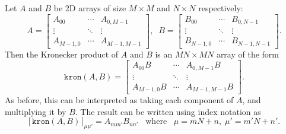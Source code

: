 \documentclass[prx,12pt]{revtex4-2}
\begin{document}
Let $A$ and $B$ be 2D arrays of size $M\times M$ and $N\times N$
respectively:
\begin{equation}
  A = \begin{bmatrix}A_{00} & \cdots & A_{0,M-1} \\ \vdots & \ddots & \vdots \\ A_{M-1,0} & \cdots & A_{M-1,M-1} \end{bmatrix}, \;\;
  B = \begin{bmatrix}B_{00} & \cdots & B_{0,N-1} \\ \vdots & \ddots & \vdots \\  B_{N-1,0} & \cdots & B_{N-1,N-1} \end{bmatrix}.
\end{equation}
Then the Kronecker product of $A$ and $B$ is an $MN\times MN$ array of
the form
\begin{equation}
  \texttt{kron}(A,B) = \begin{bmatrix} A_{00}B & \cdots & A_{0,M-1}B \\ \vdots & \ddots & \vdots \\ A_{M-1,0}B & \cdots & A_{M-1,M-1}B\end{bmatrix}.
    \label{kronAB_explicit}
\end{equation}
As before, this can be interpreted as taking each component of $A$,
and multiplying it by $B$.  The result can be written using index
notation as
\begin{equation}
  \big[\,\texttt{kron}(A,B)\,\big]_{\mu\mu'} = A_{mm'} B_{nn'}\;\;\;\mathrm{where}\;\;\;\mu = mN+n, \; \mu' = m'N+n'.
  \label{kronAB}
\end{equation}
\end{document}
